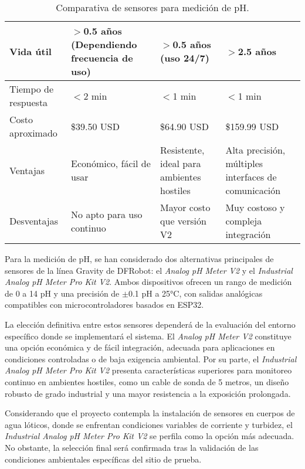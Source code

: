 \begin{table}[H]
\begin{tabular}{
        |p{4cm}       
        |p{3cm}      
        |p{3cm}       
        |p{3cm}|      
    }
    Vida útil 
        & $>$0.5 años (Dependiendo frecuencia de uso)
        & $>$0.5 años (uso 24/7) 
        & $>$2.5 años \\ 
    \hline
    
    Tiempo de respuesta 
        & $<$2 min 
        & $<$1 min 
        & $<$1 min \\ 
    \hline
    
    Costo aproximado 
        & \$39.50 USD 
        & \$64.90 USD 
        & \$159.99 USD  \\ 
    \hline
    
    Ventajas 
        & Económico, fácil de usar 
        & Resistente, ideal para ambientes hostiles 
        & Alta precisión, múltiples interfaces de comunicación \\ 
    \hline
    
    Desventajas 
        & No apto para uso continuo 
        & Mayor costo que versión V2 
        & Muy costoso y compleja integración \\ 
    \hline
    \end{tabular}
    
    \caption{Comparativa de sensores para medición de pH.}
    \label{tab:sensores_ph}
\end{table}



Para la medición de pH, se han considerado dos alternativas principales de sensores de la línea Gravity de DFRobot: el \textit{Analog pH Meter V2} y el \textit{Industrial Analog pH Meter Pro Kit V2}. Ambos dispositivos ofrecen un rango de medición de 0 a 14 pH y una precisión de $\pm$0.1 pH a 25°C, con salidas analógicas compatibles con microcontroladores basados en ESP32.

La elección definitiva entre estos sensores dependerá de la evaluación del entorno específico donde se implementará el sistema. El \textit{Analog pH Meter V2} constituye una opción económica y de fácil integración, adecuada para aplicaciones en condiciones controladas o de baja exigencia ambiental. Por su parte, el \textit{Industrial Analog pH Meter Pro Kit V2} presenta características superiores para monitoreo continuo en ambientes hostiles, como un cable de sonda de 5 metros, un diseño robusto de grado industrial y una mayor resistencia a la exposición prolongada.

Considerando que el proyecto contempla la instalación de sensores en cuerpos de agua lóticos, donde se enfrentan condiciones variables de corriente y turbidez, el \textit{Industrial Analog pH Meter Pro Kit V2} se perfila como la opción más adecuada. No obstante, la selección final será confirmada tras la validación de las condiciones ambientales específicas del sitio de prueba.

